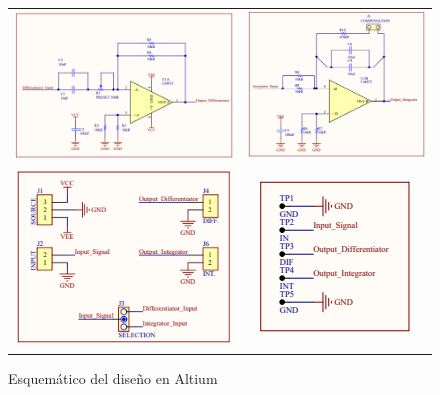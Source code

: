 \begin{figure}[H]
	\centering
	\begin{tabular}{c c}
		\includegraphics[scale=0.62]{Recursos/Altium/Derivador_esquematico.png} &
		\includegraphics[scale=0.65]{Recursos/Altium/Integrador_esquematico.png} \\
		\includegraphics[scale=0.7]{Recursos/Altium/Entradas_salidas_esquematico.png} &
		\includegraphics[scale=0.7]{Recursos/Altium/Puntos_prueba_esquematico.png}
	\end{tabular}
	\caption{Esquem\'atico del dise\~no en Altium}
	\label{fig:altium_sch}
\end{figure}

